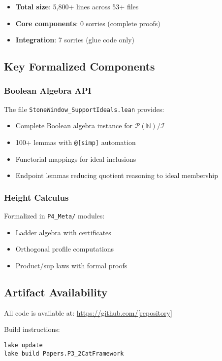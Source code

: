 \documentclass[11pt]{article}
\newcommand{\N}{\mathbb{N}}
\begin{document}
\begin{itemize}
\item \textbf{Total size}: 5,800+ lines across 53+ files
\item \textbf{Core components}: 0 sorries (complete proofs)
\item \textbf{Integration}: 7 sorries (glue code only)
\end{itemize}

\subsection{Key Formalized Components}

\subsubsection{Boolean Algebra API}

The file \texttt{StoneWindow\_SupportIdeals.lean} provides:
\begin{itemize}
\item Complete Boolean algebra instance for $\mathcal{P}(\N)/\mathcal{I}$
\item 100+ lemmas with \texttt{@[simp]} automation
\item Functorial mappings for ideal inclusions
\item Endpoint lemmas reducing quotient reasoning to ideal membership
\end{itemize}

\subsubsection{Height Calculus}

Formalized in \texttt{P4\_Meta/} modules:
\begin{itemize}
\item Ladder algebra with certificates
\item Orthogonal profile computations
\item Product/sup laws with formal proofs
\end{itemize}

\subsection{Artifact Availability}

All code is available at: \url{https://github.com/[repository]}

Build instructions:
\begin{verbatim}
lake update
lake build Papers.P3_2CatFramework
\end{verbatim}
\end{document}
